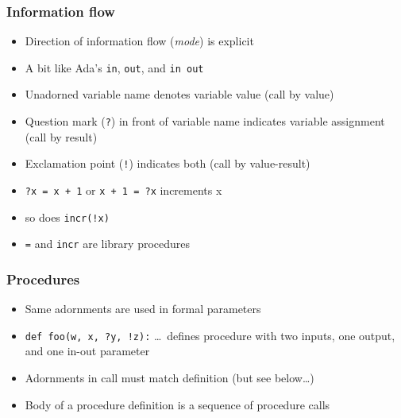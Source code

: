 \documentclass[12pt]{beamer}
\begin{document}
\begin{frame}
\frametitle{Information flow}
\begin{itemize}
\item Direction of information flow (\emph{mode}) is explicit
\item A bit like Ada's \texttt{in}, \texttt{out}, and \texttt{in out}
\item Unadorned variable name denotes variable value (call by value)
\item Question mark (\texttt{?}) in front of variable name indicates
  variable assignment (call by result)
\item Exclamation point (\texttt{!}) indicates both (call by value-result)
\item \texttt{?x = x + 1} or \texttt{x + 1 = ?x} increments x
\item so does \texttt{incr(!x)}
\item \texttt{=} and \texttt{incr} are library procedures
\end{itemize}
\end{frame}


\begin{frame}
\frametitle{Procedures}
\begin{itemize}
\item Same adornments are used in formal parameters
\item \texttt{def foo(w, x, ?y, !z):} \ldots\ defines procedure with two
  inputs, one output, and one in-out parameter
\item Adornments in call must match definition (but see below\ldots)
\item Body of a procedure definition is a sequence of
  procedure calls
\end{itemize}
\end{frame}
\end{document}
